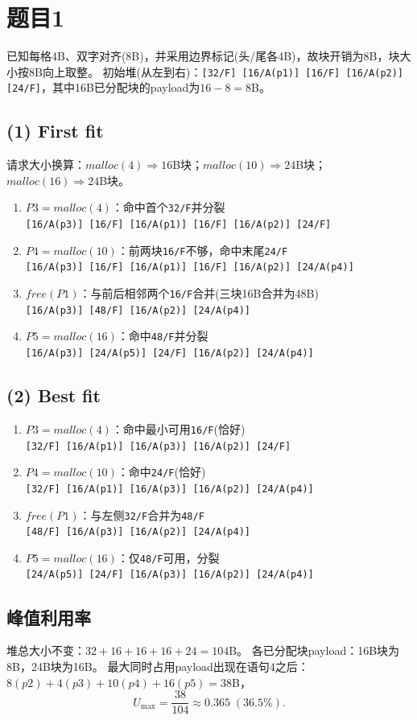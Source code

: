 \documentclass[fleqn]{ctexart}
\begin{document}
\section*{题目1}

已知每格4B、双字对齐(8B)，并采用边界标记(头/尾各4B)，故块开销为8B，块大小按8B向上取整。
初始堆(从左到右)：\texttt{[32/F]\,[16/A(p1)]\,[16/F]\,[16/A(p2)]\,[24/F]}，其中16B已分配块的payload为$16-8=8$B。

\subsection*{(1) First fit}
请求大小换算：$malloc(4)\Rightarrow 16$B块；$malloc(10)\Rightarrow 24$B块；$malloc(16)\Rightarrow 24$B块。
\begin{enumerate}[leftmargin=*]
	\item $P3=malloc(4)$：命中首个\texttt{32/F}并分裂
	\\ \texttt{[16/A(p3)]\,[16/F]\,[16/A(p1)]\,[16/F]\,[16/A(p2)]\,[24/F]}
	\item $P4=malloc(10)$：前两块\texttt{16/F}不够，命中末尾\texttt{24/F}
	\\ \texttt{[16/A(p3)]\,[16/F]\,[16/A(p1)]\,[16/F]\,[16/A(p2)]\,[24/A(p4)]}
	\item $free(P1)$：与前后相邻两个\texttt{16/F}合并(三块16B合并为48B)
	\\ \texttt{[16/A(p3)]\,[48/F]\,[16/A(p2)]\,[24/A(p4)]}
	\item $P5=malloc(16)$：命中\texttt{48/F}并分裂
	\\ \texttt{[16/A(p3)]\,[24/A(p5)]\,[24/F]\,[16/A(p2)]\,[24/A(p4)]}
\end{enumerate}

\subsection*{(2) Best fit}
\begin{enumerate}[leftmargin=*]
	\item $P3=malloc(4)$：命中最小可用\texttt{16/F}(恰好)
	\\ \texttt{[32/F]\,[16/A(p1)]\,[16/A(p3)]\,[16/A(p2)]\,[24/F]}
	\item $P4=malloc(10)$：命中\texttt{24/F}(恰好)
	\\ \texttt{[32/F]\,[16/A(p1)]\,[16/A(p3)]\,[16/A(p2)]\,[24/A(p4)]}
	\item $free(P1)$：与左侧\texttt{32/F}合并为\texttt{48/F}
	\\ \texttt{[48/F]\,[16/A(p3)]\,[16/A(p2)]\,[24/A(p4)]}
	\item $P5=malloc(16)$：仅\texttt{48/F}可用，分裂
	\\ \texttt{[24/A(p5)]\,[24/F]\,[16/A(p3)]\,[16/A(p2)]\,[24/A(p4)]}
\end{enumerate}

\subsection*{峰值利用率}
堆总大小不变：$32+16+16+16+24=104$B。
各已分配块payload：16B块为8B，24B块为16B。
最大同时占用payload出现在语句4之后：$8(p2)+4(p3)+10(p4)+16(p5)=38$B，
$$U_{\max}=\frac{38}{104}\approx 0.365\;(36.5\%).$$
\end{document}
